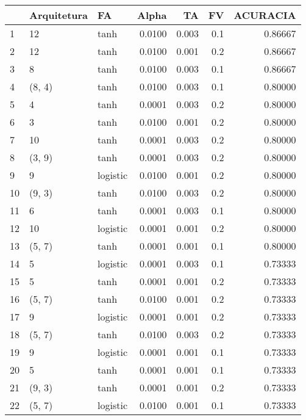\begin{tabular}{lllrrrr}
\toprule
{} & Arquitetura &        FA &   Alpha &     TA &   FV &  ACURACIA \\
\midrule
1   &          12 &      tanh &  0.0100 &  0.003 &  0.1 &   0.86667 \\
2   &          12 &      tanh &  0.0100 &  0.001 &  0.2 &   0.86667 \\
3   &           8 &      tanh &  0.0100 &  0.003 &  0.1 &   0.86667 \\
4   &      (8, 4) &      tanh &  0.0100 &  0.003 &  0.1 &   0.80000 \\
5   &           4 &      tanh &  0.0001 &  0.003 &  0.2 &   0.80000 \\
6   &           3 &      tanh &  0.0100 &  0.001 &  0.2 &   0.80000 \\
7   &          10 &      tanh &  0.0001 &  0.003 &  0.2 &   0.80000 \\
8   &      (3, 9) &      tanh &  0.0001 &  0.003 &  0.2 &   0.80000 \\
9   &           9 &  logistic &  0.0100 &  0.001 &  0.2 &   0.80000 \\
10  &      (9, 3) &      tanh &  0.0100 &  0.003 &  0.2 &   0.80000 \\
11  &           6 &      tanh &  0.0001 &  0.003 &  0.1 &   0.80000 \\
12  &          10 &  logistic &  0.0001 &  0.001 &  0.2 &   0.80000 \\
13  &      (5, 7) &      tanh &  0.0001 &  0.001 &  0.1 &   0.80000 \\
14  &           5 &  logistic &  0.0001 &  0.003 &  0.1 &   0.73333 \\
15  &           5 &      tanh &  0.0001 &  0.001 &  0.2 &   0.73333 \\
16  &      (5, 7) &      tanh &  0.0100 &  0.001 &  0.2 &   0.73333 \\
17  &           9 &  logistic &  0.0001 &  0.001 &  0.2 &   0.73333 \\
18  &      (5, 7) &      tanh &  0.0100 &  0.003 &  0.2 &   0.73333 \\
19  &           9 &  logistic &  0.0001 &  0.001 &  0.1 &   0.73333 \\
20  &           5 &      tanh &  0.0001 &  0.001 &  0.1 &   0.73333 \\
21  &      (9, 3) &      tanh &  0.0001 &  0.001 &  0.2 &   0.73333 \\
22  &      (5, 7) &  logistic &  0.0100 &  0.001 &  0.1 &   0.73333 \\

\end{tabular}
